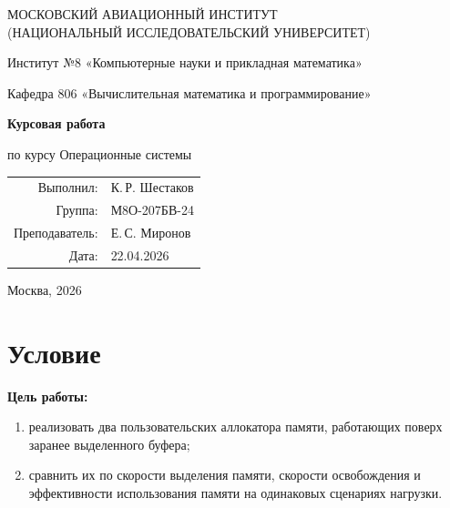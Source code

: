 \documentclass[unicode, 12pt, a4paper, oneside, fleqn]{article}
\newcommand{\reporttype}{Курсовая работа}
\newcommand{\reportcourse}{Операционные системы}
\newcommand{\reportauthor}{К.\,Р. Шестаков}
\newcommand{\reportgroup}{М8О-207БВ-24}
\newcommand{\reportteacher}{Е.\,С. Миронов}
\newcommand{\reportdate}{22.04.2026}
\newcommand{\reportcity}{Москва}
\newcommand{\reportyear}{2026}
\begin{document}
\hypersetup{pageanchor=false}
\begin{titlepage}
\begin{center}
\large
МОСКОВСКИЙ АВИАЦИОННЫЙ ИНСТИТУТ\\
(НАЦИОНАЛЬНЫЙ ИССЛЕДОВАТЕЛЬСКИЙ УНИВЕРСИТЕТ)

\vspace{20pt}

Институт №8 «Компьютерные науки и прикладная математика»

Кафедра 806 «Вычислительная математика и программирование»
\end{center}

\vspace{58pt}

\begin{center}
{\Large\bfseries \reporttype\par}
\vspace{6pt}
{\large по курсу \reportcourse\par}

\vspace{54pt}
\end{center}

\vfill

\begin{flushright}
\large
\begin{tabular}{rl}
Выполнил: & \reportauthor \\
Группа: & \reportgroup \\
Преподаватель: & \reportteacher \\
Дата: & \reportdate \\
\end{tabular}
\end{flushright}

\vspace{84pt}

\begin{center}
\large
\reportcity, \reportyear
\end{center}
\end{titlepage}

\clearpage
\hypersetup{pageanchor=true}
\pagestyle{plain}
\setcounter{page}{1}

\section{Условие}

\noindent\textbf{Цель работы:}
\begin{enumerate}[leftmargin=1.5cm]
\item реализовать два пользовательских аллокатора памяти, работающих поверх заранее выделенного буфера;
\item сравнить их по скорости выделения памяти, скорости освобождения и эффективности использования памяти на одинаковых сценариях нагрузки.
\end{enumerate}
\end{document}

